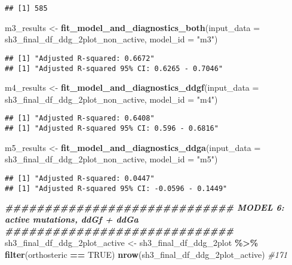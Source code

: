 \documentclass[
]{article}
\newenvironment{Shaded}{\begin{snugshade}}{\end{snugshade}}
\newcommand{\AttributeTok}[1]{\textcolor[rgb]{0.13,0.29,0.53}{#1}}
\newcommand{\CommentTok}[1]{\textcolor[rgb]{0.56,0.35,0.01}{\textit{#1}}}
\newcommand{\ConstantTok}[1]{\textcolor[rgb]{0.56,0.35,0.01}{#1}}
\newcommand{\DocumentationTok}[1]{\textcolor[rgb]{0.56,0.35,0.01}{\textbf{\textit{#1}}}}
\newcommand{\FunctionTok}[1]{\textcolor[rgb]{0.13,0.29,0.53}{\textbf{#1}}}
\newcommand{\NormalTok}[1]{#1}
\newcommand{\OtherTok}[1]{\textcolor[rgb]{0.56,0.35,0.01}{#1}}
\newcommand{\SpecialCharTok}[1]{\textcolor[rgb]{0.81,0.36,0.00}{\textbf{#1}}}
\newcommand{\StringTok}[1]{\textcolor[rgb]{0.31,0.60,0.02}{#1}}
\begin{document}
\begin{verbatim}
## [1] 585
\end{verbatim}

\begin{Shaded}
\begin{Highlighting}[]
\NormalTok{m3\_results }\OtherTok{\textless{}{-}} \FunctionTok{fit\_model\_and\_diagnostics\_both}\NormalTok{(}\AttributeTok{input\_data =}\NormalTok{ sh3\_final\_df\_ddg\_2plot\_non\_active, }\AttributeTok{model\_id =} \StringTok{"m3"}\NormalTok{)}
\end{Highlighting}
\end{Shaded}

\begin{verbatim}
## [1] "Adjusted R-squared: 0.6672"
## [1] "Adjusted R-squared 95% CI: 0.6265 - 0.7046"
\end{verbatim}

\begin{Shaded}
\begin{Highlighting}[]
\NormalTok{m4\_results }\OtherTok{\textless{}{-}} \FunctionTok{fit\_model\_and\_diagnostics\_ddgf}\NormalTok{(}\AttributeTok{input\_data =}\NormalTok{ sh3\_final\_df\_ddg\_2plot\_non\_active, }\AttributeTok{model\_id =} \StringTok{"m4"}\NormalTok{)}
\end{Highlighting}
\end{Shaded}

\begin{verbatim}
## [1] "Adjusted R-squared: 0.6408"
## [1] "Adjusted R-squared 95% CI: 0.596 - 0.6816"
\end{verbatim}

\begin{Shaded}
\begin{Highlighting}[]
\NormalTok{m5\_results }\OtherTok{\textless{}{-}} \FunctionTok{fit\_model\_and\_diagnostics\_ddga}\NormalTok{(}\AttributeTok{input\_data =}\NormalTok{ sh3\_final\_df\_ddg\_2plot\_non\_active, }\AttributeTok{model\_id =} \StringTok{"m5"}\NormalTok{)}
\end{Highlighting}
\end{Shaded}

\begin{verbatim}
## [1] "Adjusted R-squared: 0.0447"
## [1] "Adjusted R-squared 95% CI: -0.0596 - 0.1449"
\end{verbatim}

\begin{Shaded}
\begin{Highlighting}[]
\DocumentationTok{\#\#\#\#\#\#\#\#\#\#\#\#\#\#\#\#\#\#\#\#\#\#\#\#\#\#\#\#\# MODEL 6: active mutations, ddGf + ddGa \#\#\#\#\#\#\#\#\#\#\#\#\#\#\#\#\#\#\#\#\#\#\#\#\#\#\#\#\#}
\NormalTok{sh3\_final\_df\_ddg\_2plot\_active }\OtherTok{\textless{}{-}}\NormalTok{ sh3\_final\_df\_ddg\_2plot }\SpecialCharTok{\%\textgreater{}\%} \FunctionTok{filter}\NormalTok{(orthosteric }\SpecialCharTok{==} \ConstantTok{TRUE}\NormalTok{)}
\FunctionTok{nrow}\NormalTok{(sh3\_final\_df\_ddg\_2plot\_active) }\CommentTok{\#171}
\end{Highlighting}
\end{Shaded}
\end{document}
